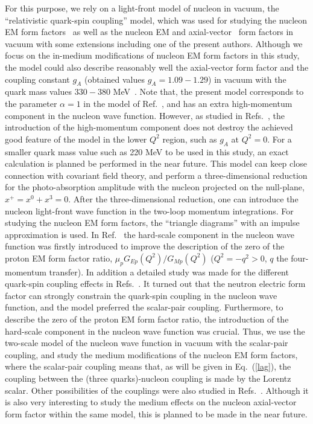 \documentclass[preprint,aps,showpacs,floatfix]{revtex4}
\begin{document}
For this purpose, we rely on a light-front model of nucleon in vacuum, the 
``relativistic quark-spin coupling'' model, which was 
used for studying the nucleon EM form factors~\cite{afsbw,Wilson2} 
as well as the nucleon EM and axial-vector~\cite{Suisso} form factors 
in vacuum with some extensions including one of the present authors. 
Although we focus on the in-medium modifications of nucleon EM form factors 
in this study, the model could also describe reasonably well 
the axial-vector form factor and the coupling constant $g_A$ (obtained values 
$g_A = 1.09 - 1.29$) in vacuum with the quark mass values $330 - 380$ MeV~\cite{Suisso}. 
Note that, the present model corresponds to the parameter $\alpha = 1$ 
in the model of Ref.~\cite{Suisso}, and has an extra high-momentum component  
in the nucleon wave function. However, as studied in Refs.~\cite{afsbw,Wilson2}, 
the introduction of the high-momentum component does not destroy the achieved 
good feature of the model in the lower $Q^2$ region, such as $g_A$ at $Q^2 = 0$. 
For a smaller quark mass value such as 220 MeV to be used in this study, 
an exact calculation is planned be performed in the near future.
This model can keep close connection with covariant field theory,  
and perform a three-dimensional reduction for the photo-absorption amplitude 
with the nucleon projected on the null-plane, $x^+ = x^0 + x^3 = 0$.
After the three-dimensional reduction, one can introduce the nucleon light-front 
wave function in the two-loop momentum integrations. 
For studying the nucleon EM form factors, 
the ``triangle diagrams'' with an impulse approximation is used.
In Ref.~\cite{afsbw} the hard-scale component in the nucleon wave function 
was firstly introduced to improve the description of the zero of the 
proton EM form factor ratio, $\mu_p G_{Ep}(Q^2)/G_{Mp}(Q^2)$ 
($Q^2 = - q^2 > 0$, $q$ the four-momentum transfer). 
In addition a detailed study was made for the different quark-spin coupling 
effects in Refs.~\cite{afsbw,Wilson2}.
It turned out that the neutron electric form factor can strongly constrain 
the quark-spin coupling in the nucleon wave function, and the model preferred the scalar-pair 
coupling. Furthermore, to describe the zero of the proton EM form factor ratio, 
the introduction of the hard-scale component in the nucleon wave function was crucial. 
Thus, we use the two-scale model of the nucleon wave function in vacuum 
with the scalar-pair coupling, and study the medium modifications of the 
nucleon EM form factors, where the scalar-pair coupling means that, 
as will be given in Eq.~(\ref{lag}), the coupling between 
the (three quarks)-nucleon coupling is made by the Lorentz scalar. Other possibilities 
of the couplings were also studied in Refs.~\cite{afsbw,Wilson2,Suisso}. 
Although it is also very interesting to study 
the medium effects on the nucleon axial-vector form factor within the same model, 
this is planned to be made in the near future.
\end{document}

